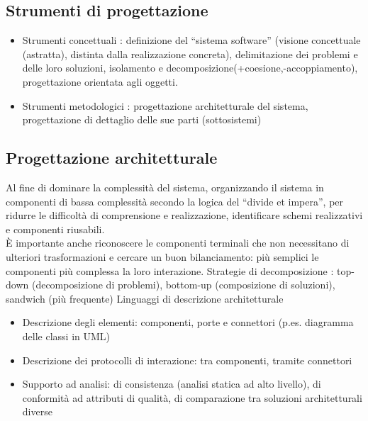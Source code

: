 \subsection{Strumenti di progettazione}
\begin{itemize}
\item Strumenti concettuali : definizione del ``sistema software'' (visione concettuale (astratta), distinta dalla realizzazione concreta), delimitazione dei problemi e delle loro soluzioni, isolamento e decomposizione(+coesione,-accoppiamento), progettazione orientata agli oggetti.
\item Strumenti metodologici : progettazione architetturale del sistema, progettazione di dettaglio delle sue parti (sottosistemi)
\end{itemize}

\subsection{Progettazione architetturale}
Al fine di dominare la complessità del sistema, organizzando il sistema in componenti di bassa complessità secondo la logica del ``divide et impera'', per ridurre le difficoltà di comprensione e realizzazione, identificare schemi realizzativi e componenti riusabili.\\
\`E importante anche riconoscere le componenti terminali che non necessitano di ulteriori trasformazioni e cercare un buon bilanciamento: più semplici le componenti più complessa la loro interazione.
Strategie di decomposizione : top-down (decomposizione di problemi), bottom-up (composizione di soluzioni), sandwich (più frequente)
Linguaggi di descrizione architetturale
\begin{itemize}
\item Descrizione degli elementi: componenti, porte e connettori (p.es. diagramma delle classi in UML)
\item Descrizione dei protocolli di interazione: tra componenti, tramite connettori
\item Supporto ad analisi: di consistenza (analisi statica ad alto livello), di conformità ad attributi di qualità, di comparazione tra soluzioni architetturali diverse
\end{itemize}

